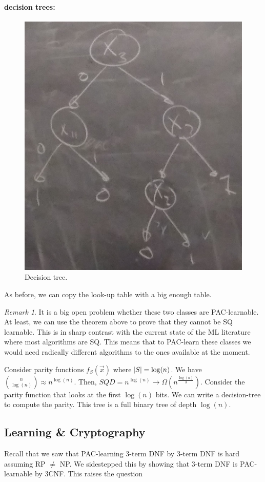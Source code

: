 \documentclass[12pt, letterpaper]{article}
\numberwithin{equation}{section} %
\theoremstyle{definition}
\theoremstyle{remark}
\newtheorem{remark}[theorem]{Remark}
\begin{document}
\paragraph{decision trees:}
\begin{figure}[H]
\centering
\includegraphics[width=0.6\linewidth]{../img/tree}
\caption{Decision tree.}
\end{figure}
As before, we can copy the look-up table with a big enough table.

\begin{remark}
It is a big open problem whether these two classes are PAC-learnable. At least, we can use the theorem above to prove that they cannot be SQ learnable. This is in sharp contrast with the current state of the ML literature where most algorithms are SQ. This means that to PAC-learn these classes we would need radically different algorithms to the ones available at the moment.
\end{remark}

Consider parity functions $f_S(\vec x)$ where $\abs{S} = \log(n)$. We have $\binom{n}{\log (n)} \approx n^{\log(n)}$. Then, $SQD = n^{\log(n)} \rightarrow \Omega(n^{\frac{\log(n)}3})$. Consider the parity function that looks at the first $\log(n)$ bits. We can write a decision-tree to compute the parity.  This tree is a full binary tree of depth $\log(n)$.

\subsection{Learning \& Cryptography}
Recall that we saw that PAC-learning 3-term DNF by 3-term DNF is hard assuming RP $\ne$ NP. We sidestepped this by showing that 3-term DNF is PAC-learnable by 3CNF. This raises the question
\end{document}
